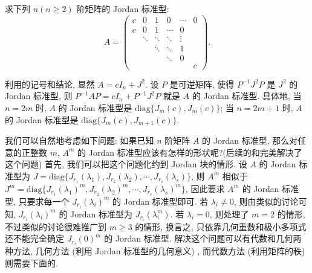 \documentclass[../../main.tex]{subfiles}
\begin{document}
\begin{example}
求下列 $n(n \geq 2)$ 阶矩阵的 Jordan 标准型:
\[
A = \begin{pmatrix}
c & 0 & 1 & 0 & \cdots & 0 \\
c & 0 & 1 & \cdots & 0 \\
& \ddots & \ddots & \ddots & \vdots \\
& & \ddots & \ddots & 1 \\
& & & \ddots & 0 \\
& & & & & c
\end{pmatrix}.
\]
\end{example}
\begin{solution}
利用的记号和结论, 显然 $A = cI_n + J^2$. 设 $P$ 是可逆矩阵, 使得 $P^{-1}J^2P$ 是 $J^2$ 的 Jordan 标准型, 则 $P^{-1}AP = cI_n + P^{-1}J^2P$ 就是 $A$ 的 Jordan 标准型. 具体地, 当 $n = 2m$ 时, $A$ 的 Jordan 标准型是 $\mathrm{diag}\{J_m(c),J_m(c)\}$; 当 $n = 2m + 1$ 时, $A$ 的 Jordan 标准型是 $\mathrm{diag}\{J_m(c),J_{m + 1}(c)\}$.
\end{solution}

\vspace{0.5cm}

我们可以自然地考虑如下问题: 如果已知 $n$ 阶矩阵 $A$ 的 Jordan 标准型, 那么对任意的正整数 $m$, $A^m$ 的 Jordan 标准型应该有怎样的形状呢?(后续的和完美解决了这个问题) 首先, 我们可以把这个问题化约到 Jordan 块的情形. 设 $A$ 的 Jordan 标准型为 $J = \mathrm{diag}\{J_{r_1}(\lambda_1),J_{r_2}(\lambda_2),\cdots,J_{r_s}(\lambda_s)\}$, 则 $A^m$ 相似于 $J^m = \mathrm{diag}\{J_{r_1}(\lambda_1)^m,J_{r_2}(\lambda_2)^m,\cdots,J_{r_s}(\lambda_s)^m\}$, 因此要求 $A^m$ 的 Jordan 标准型, 只要求每一个 $J_{r_i}(\lambda_i)^m$ 的 Jordan 标准型即可. 若 $\lambda_i \neq 0$, 则由类似的讨论可知, $J_{r_i}(\lambda_i)^m$ 的 Jordan 标准型为 $J_{r_i}(\lambda_i^m)$. 若 $\lambda_i = 0$, 则处理了 $m = 2$ 的情形, 不过类似的讨论很难推广到 $m \geq 3$ 的情形, 换言之, 只依靠几何重数和极小多项式还不能完全确定 $J_{r_i}(0)^m$ 的 Jordan 标准型. 解决这个问题可以有代数和几何两种方法, 几何方法 (利用 Jordan 标准型的几何意义) , 而代数方法 (利用矩阵的秩) 则需要下面的.
\end{document}
